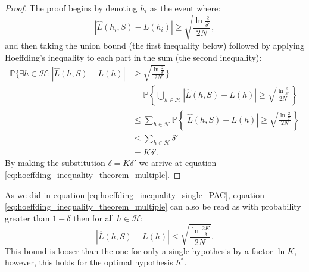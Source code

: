 \begin{proof}
  The proof begins by denoting $h_i$ as the event where: 
  \begin{equation*}
    \left| \hat{L}(h_i, S) - L(h_i) \right| \geq \sqrt{\frac{\ln \frac{2}{\delta'}}{2N}},
  \end{equation*}
   and then taking the union bound (the first inequality below) followed by applying Hoeffding's inequality to each part in the sum (the second inequality): 
\begin{equation*}
  \begin{split}
    \mathbb{P} \Biggl\{ \exists h \in \mathcal{H}: \left| \hat{L}(h, S) - L(h) \right| &\geq \sqrt{\frac{\ln \frac{2}{\delta'}}{2N}}  \Biggr\} \\
    &= \mathbb{P} \left\{ \bigcup_{h \in \mathcal{H}} \left| \hat{L}(h, S) - L(h) \right| \geq \sqrt{\frac{\ln \frac{2}{\delta'}}{2N}}  \right\}  \\
    &\leq \sum_{h \in \mathcal{H}} \mathbb{P} \left\{\left| \hat{L}(h, S) - L(h) \right| \geq \sqrt{\frac{\ln \frac{2}{\delta'}}{2N}} \right\}  \\
    &\leq \sum_{h \in \mathcal{H}} \delta' \\
    &= K \delta'.
  \end{split}
\end{equation*}
By making the substitution $\delta = K \delta'$ we arrive at equation \eqref{eq:hoeffding_inequality_theorem_multiple}. 
\end{proof}

As we did in equation \eqref{eq:hoeffding_inequality_single_PAC}, equation \eqref{eq:hoeffding_inequality_theorem_multiple} can also be read as with probability greater than $1-\delta$ then for all $h\in\mathcal{H}$:
\begin{equation}
  \label{eq:hoeffding_inequality_multi_PAC}
  \left| \hat{L}(h, S) - L(h) \right| \leq \sqrt{\frac{\ln \frac{2K}{\delta}}{2N}}.
\end{equation}
This bound is looser than the one for only a single hypothesis by a factor $\ln K$, however, this holds for the optimal hypothesis $h^*$. 

